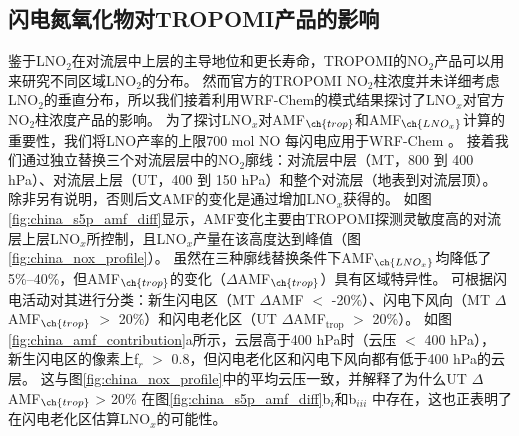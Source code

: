 \subsection{闪电氮氧化物对TROPOMI产品的影响}  \label{sec:lnox_affects_tropomi}

鉴于LNO$_2$在对流层中上层的主导地位和更长寿命，TROPOMI的NO$_2$产品可以用来研究不同区域LNO$_2$的分布。
然而官方的TROPOMI NO$_2$柱浓度并未详细考虑LNO$_2$的垂直分布，所以我们接着利用WRF-Chem的模式结果探讨了LNO$_x$对官方NO$_2$柱浓度产品的影响。
为了探讨LNO$_x$对AMF$_{\ch{trop}}$和AMF$_{\ch{LNO_x}}$计算的重要性，我们将LNO产率的上限700 mol NO 每闪电\citep{Ott.2010}应用于WRF-Chem 。
接着我们通过独立替换三个对流层层中的NO$_2$廓线：对流层中层（MT，800 到 400 hPa）、对流层上层（UT，400 到 150 hPa）和整个对流层（地表到对流层顶）。
除非另有说明，否则后文AMF的变化是通过增加LNO$_x$获得的。
如图\ref{fig:china_s5p_amf_diff}显示，AMF变化主要由TROPOMI探测灵敏度高的对流层上层LNO$_x$所控制\citep{Beirle.2009,Laughner.2017}，且LNO$_x$产量在该高度达到峰值（图\ref{fig:china_nox_profile}）。
虽然在三种廓线替换条件下AMF$_{\ch{LNO_x}}$均降低了5\%--40\%，但AMF$_{\ch{trop}}$的变化（$\Delta$AMF$_{\ch{trop}}$）具有区域特异性。
可根据闪电活动对其进行分类：新生闪电区（MT $\Delta$AMF $<$ -20\%）、闪电下风向（MT $\Delta$AMF$_{\ch{trop}}$ $>$ 20\%）和闪电老化区（UT $\Delta$AMF$_\textrm{trop}$ $>$ 20\%）。
如图\ref{fig:china_amf_contribution}a所示，云层高于400 hPa时（云压 $<$ 400 hPa），
新生闪电区的像素上f$_r$ $>$ 0.8，但闪电老化区和闪电下风向都有低于400 hPa的云层。
这与图\ref{fig:china_nox_profile}中的平均云压一致，并解释了为什么UT $\Delta$AMF$_{\ch{trop}}$ > 20\% 在图\ref{fig:china_s5p_amf_diff}b$_i$和b$_{iii}$ 中存在，这也正表明了在闪电老化区估算LNO$_x$的可能性。


